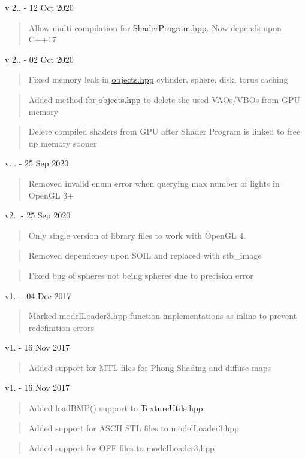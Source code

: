 v 2.. -\/ 12 Oct 2020 \begin{quote}
Allow multi-\/compilation for \mbox{\hyperlink{_shader_program_8hpp}{Shader\+Program.\+hpp}}. Now depends upon C++17 \end{quote}
v 2.. -\/ 02 Oct 2020 \begin{quote}
Fixed memory leak in \mbox{\hyperlink{objects_8hpp}{objects.\+hpp}} cylinder, sphere, disk, torus caching \end{quote}
\begin{quote}
Added method for \mbox{\hyperlink{objects_8hpp}{objects.\+hpp}} to delete the used VAOs/\+VBOs from GPU memory \end{quote}
\begin{quote}
Delete compiled shaders from GPU after Shader Program is linked to free up memory sooner \end{quote}
v... -\/ 25 Sep 2020 \begin{quote}
Removed invalid enum error when querying max number of lights in Open\+GL 3+ \end{quote}
v2.. -\/ 25 Sep 2020 \begin{quote}
Only single version of library files to work with Open\+GL 4. \end{quote}
\begin{quote}
Removed dependency upon SOIL and replaced with stb\+\_\+image \end{quote}
\begin{quote}
Fixed bug of spheres not being spheres due to precision error \end{quote}
v1.. -\/ 04 Dec 2017 \begin{quote}
Marked model\+Loader3.\+hpp function implementations as inline to prevent redefinition errors \end{quote}
v1. -\/ 16 Nov 2017 \begin{quote}
Added support for MTL files for Phong Shading and diffuse maps \end{quote}
v1. -\/ 16 Nov 2017 \begin{quote}
Added load\+BMP() support to \mbox{\hyperlink{_texture_utils_8hpp}{Texture\+Utils.\+hpp}} \end{quote}
\begin{quote}
Added support for ASCII STL files to model\+Loader3.\+hpp \end{quote}
\begin{quote}
Added support for OFF files to model\+Loader3.\+hpp \end{quote}
